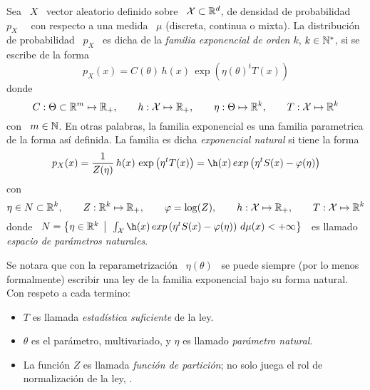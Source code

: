 \begin{definicion}\label{Def:MP:FamiliaExponencial}
%
  Sea  \ $X$  \  vector aleatorio  definido  sobre \  $\mathcal{X}  \subset \mathbb{R}^d$,  de
  densidad  de probabilidad  \  $p_X$ \  \ con  respecto  a una  medida \  $\mu$
  (discreta, continua o  mixta). La distribuci\'on de probabilidad  \ $p_X$ \ es
  dicha de  la {\em familia  exponencial de orden  $k$}, $k \in \mathbb{N}^*$,  si se
  escribe de la forma
  \[
  p_X(x) = C(\theta) \, h(x) \, \exp\left( \eta(\theta)^t T(x) \right)
  \]
  donde
  \[
  C:  \Theta \subset  \mathbb{R}^m \mapsto  \mathbb{R}_+,  \qquad h:  \mathcal{X} \mapsto  \mathbb{R}_+,
  \qquad \eta: \Theta \mapsto \mathbb{R}^k, \qquad T: \mathcal{X} \mapsto \mathbb{R}^k
  \]
  con \ $m \in \mathbb{N}$.  En otras palabras, la familia exponencial es una familia
  parametrica de la  forma as\'i definida. La familia  es dicha {\em exponencial
    natural} si tiene la forma
  \[
  p_X(x) = \frac{1}{Z(\eta)}  \, h(x) \, \exp\left( \eta^t  T(x) \right) = \h(x)
  \, exp\left( \eta^t S(x) - \varphi(\eta) \right)
  \]
  con
  \[
  \eta \in N \subset \mathbb{R}^k, \qquad Z: \mathbb{R}^k \mapsto \mathbb{R}_+, \qquad \varphi = \log(Z),
  \qquad h: \mathcal{X} \mapsto \mathbb{R}_+, \qquad T: \mathcal{X} \mapsto \mathbb{R}^k
  \]
  donde \  $N = \left\{ \eta \in  \Rset^k \tq \int_\X \h(x)  \, exp\left( \eta^t
      S(x) - \varphi(\eta) \right) \, d\mu(x)  < + \infty \right\}$ \ es llamado
  {\em espacio de par\'ametros naturales}.
\end{definicion}
%
Se notara  que con  la reparametrizaci\'on \  $\eta(\theta)$ \ se  puede siempre
(por lo  menos formalmente) escribir una  ley de la familia  exponencial bajo su
forma natural. Con respeto a cada termino:
%
\begin{itemize}
\item $T$ es llamada {\em estad\'istica suficiente} de la ley. 
%
\item  $\theta$  es el  par\'ametro,  multivariado,  y  $\eta$ es  llamado  {\em
    par\'ametro natural}.
%
\item La funci\'on $Z$ es llamada  {\em funci\'on de partici\'on}; no solo juega
  el  rol de  normalizaci\'on  de  la ley,  .
\end{itemize}

